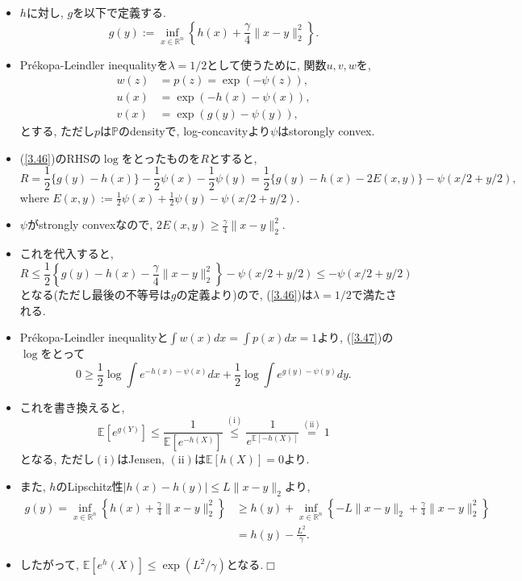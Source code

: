 \documentclass[aspectratio=169, dvipdfmx]{beamer}
\def\qed{\hfill $\Box$}
\newcommand{\ex}{\mathbb{E}}
\begin{document}
\begin{frame}
\begin{itemize}
    \item $h$に対し, $g$を以下で定義する.
    \[ g(y) := \inf_{x\in\mathbb{R}^n} \left\{h(x) + \frac{\gamma}{4}\|x-y\|_2^2\right\}.\]
    \item Pr\'ekopa-Leindler inequalityを$\lambda = 1/2$として使うために, 関数$u,v,w$を,
    \begin{align*}
        w(z) &= p(z) = \exp(-\psi(z)),\\
        u(x) &= \exp(-h(x)-\psi(x)),\\
        v(x) &= \exp(g(y)-\psi(y)),
    \end{align*}
    とする, ただし$p$は$\mathbb{P}$のdensityで, log-concavityより$\psi$はstorongly convex.
    \item (\ref{3.46})のRHSの$\log$をとったものを$R$とすると,
    \[ R = \frac{1}{2}\{g(y)-h(x)\} - \frac{1}{2}\psi(x)-\frac{1}{2}\psi(y)
    = \frac{1}{2}\{g(y)-h(x)-2E(x,y)\} - \psi(x/2+y/2), \]
    where $E(x,y):= \frac{1}{2}\psi(x)+\frac{1}{2}\psi(y)-\psi(x/2+y/2)$.
\end{itemize}
\end{frame}

\begin{frame}
\begin{itemize}
    \item $\psi$がstrongly convexなので, $2E(x,y) \ge \frac{\gamma}{4}\|x-y\|_2^2$.
    \item これを代入すると,
    \[ R\le \frac{1}{2}\left\{g(y)-h(x)-\frac{\gamma}{4}\|x-y\|_2^2\right\}-\psi(x/2+y/2)\le -\psi(x/2+y/2)\]
    となる(ただし最後の不等号は$g$の定義より)ので, (\ref{3.46})は$\lambda=1/2$で満たされる.
    \item Pr\'ekopa-Leindler inequalityと$\int w(x)dx = \int p(x)dx = 1$より, (\ref{3.47})の$\log$をとって
    \[ 0 \ge \frac{1}{2}\log\int e^{-h(x)-\psi(x)}dx + \frac{1}{2}\log\int e^{g(y)-\psi(y)}dy. \]
    \item これを書き換えると,
    \[ \mathbb{E}[e^{g(Y)}]
    \leq \frac{1}{\mathbb{E}\left[e^{-h(X)}\right]}
    \stackrel{\mathrm{(i)}}{\leq} \frac{1}{e^{\mathbb{E}[-h(X)]}} \stackrel{\mathrm{(ii)}}{=} 1 \]
    となる, ただし$\mathrm{(i)}$はJensen, $\mathrm{(ii)}$は$\ex[h(X)]=0$より.
\end{itemize}
\end{frame}

\begin{frame}
\begin{itemize}
    \item また, $h$のLipschitz性$|h(x)-h(y)|\le L\|x-y\|_2$より,
    \begin{align*}
        g(y)
        =\inf _{x \in \mathbb{R}^{n}}\left\{h(x)+\frac{\gamma}{4}\|x-y\|_{2}^{2}\right\}
        &\geq h(y)+\inf _{x \in \mathbb{R}^{n}}\left\{-L\|x-y\|_{2}+\frac{\gamma}{4}\|x-y\|_{2}^{2}\right\} \\
        &=h(y)-\frac{L^{2}}{\gamma}.
    \end{align*}
    \item したがって, $\ex[e^h(X)] \le \exp(L^2/\gamma)$となる.\qed
\end{itemize}
\end{frame}
\end{document}

